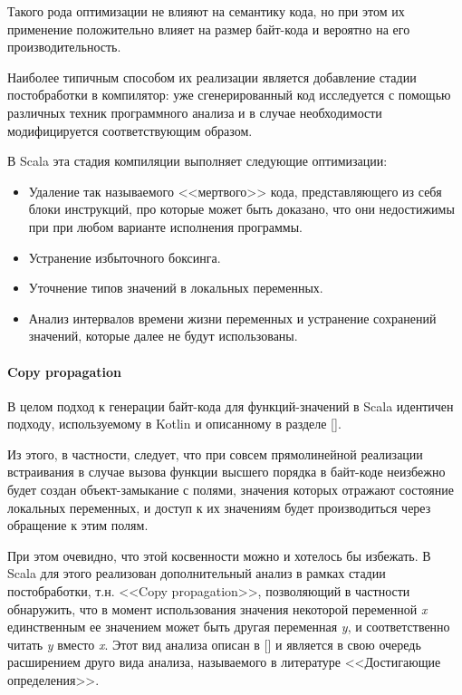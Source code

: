 Такого рода оптимизации не влияют на семантику кода, но при этом их применение положительно влияет
на размер байт-кода и вероятно на его производительность.

Наиболее типичным способом их реализации является добавление стадии постобработки в компилятор:
уже сгенерированный код исследуется с помощью различных техник программного анализа и в случае
необходимости модифицируется соответствующим образом.

В Scala эта стадия компиляции выполняет следующие оптимизации:
\begin{itemize}
    \item Удаление так называемого <<мертвого>> кода, представляющего из себя блоки инструкций,
    про которые может быть доказано, что они недостижимы при при любом варианте исполнения
    программы.
    \item Устранение избыточного боксинга.
    \item Уточнение типов значений в локальных переменных.
    \item Анализ интервалов времени жизни переменных и устранение сохранений значений,
    которые далее не будут использованы.
\end{itemize}

\paragraph{Copy propagation}
В целом подход к генерации байт-кода для  функций-значений в Scala идентичен подходу,
используемому в Kotlin и описанному в разделе [].%

Из этого, в частности, следует, что при совсем прямолинейной реализации встраивания в случае
вызова функции высшего порядка в байт-коде неизбежно будет создан объект-замыкание с полями,
значения которых отражают состояние локальных переменных, и доступ к их значениям будет
производиться через обращение к этим полям.

При этом очевидно, что этой косвенности можно и хотелось бы избежать.
В Scala для этого реализован дополнительный анализ в рамках стадии постобработки,
т.н. <<Copy propagation>>, позволяющий в частности обнаружить, что в момент использования значения
некоторой переменной \textit{x} единственным ее значением может быть другая переменная \textit{y},
и соответственно читать \textit{y} вместо \textit{x}. Этот вид анализа описан в [] %
и является в свою очередь расширением друго вида анализа, называемого в литературе
<<Достигающие определения>>.

